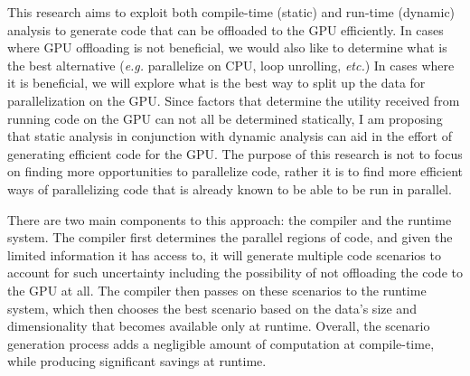 \documentclass[a4paper,12pt]{article}
\begin{document}
This research aims to exploit both compile-time (static) and run-time (dynamic) analysis to generate code that can be offloaded to the GPU efficiently. In cases where GPU offloading is not beneficial, we would also like to determine what is the best alternative (\emph{e.g.} parallelize on CPU, loop unrolling, \emph{etc.}) In cases where it is beneficial, we will explore what is the best way to split up the data for parallelization on the GPU.  Since factors that determine the utility received from running code on the GPU can not all be determined statically, I am proposing that static analysis in conjunction with dynamic analysis can aid in the effort of generating efficient code for the GPU. The purpose of this research is not to focus on finding more opportunities to parallelize code, rather it is to find more efficient ways of parallelizing code that is already known to be able to be run in parallel. 

There are two main components to this approach: the compiler and the runtime system. The compiler first determines the parallel regions of code, and given the limited information it has access to, it will generate multiple code scenarios to account for such uncertainty including the possibility of not offloading the code to the GPU at all. The compiler then passes on these scenarios to the runtime system, which then chooses the best scenario based on the data's size and dimensionality that becomes available only at runtime. Overall, the scenario generation process adds a negligible amount of computation at compile-time, while producing significant savings at runtime. 



\end{document}
